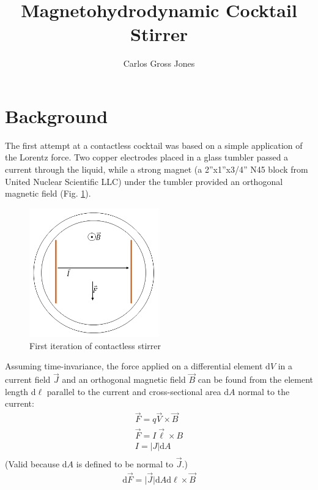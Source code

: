 \documentclass[]{article}
\title{Magnetohydrodynamic Cocktail Stirrer}
\author{Carlos Gross Jones}
\begin{document}
\maketitle

\begin{abstract}

\end{abstract}
\newpage
\section{Background}
\par The first attempt at a contactless cocktail was based on a simple application of the Lorentz force. Two copper electrodes placed in a glass tumbler passed a current through the liquid, while a strong magnet (a 2''x1''x3/4'' N45 block from United Nuclear Scientific LLC) under the tumbler provided an orthogonal magnetic field (Fig. \ref{fig:oldversion}). 
\begin{figure}
	\centering
	\includegraphics[width=0.5\textwidth]{Oldversion}
	\caption{First iteration of contactless stirrer}
	\label{fig:oldversion}
\end{figure}
Assuming time-invariance, the force applied on a differential element $\mathrm{d}V$ in a current field $\vec{J}$ and an orthogonal magnetic field $\vec{B}$ can be found from the element length d$\ell$ parallel to the current and cross-sectional area d$A$ normal to the current:
\begin{align}
\vec{F}=q\vec{V}\times\vec{B}\\
\vec{F}=I\vec{\ell}\times B\\
I=\lvert J\rvert\mathrm{d}A\\
\end{align}
(Valid because d$A$ is defined to be normal to $\vec{J}$.)
\begin{align}
\mathrm{d}\vec{F}=\lvert\vec{J}\rvert\mathrm{d}A\mathrm{d}\ell\times\vec{B}
\end{align}
\end{document}
